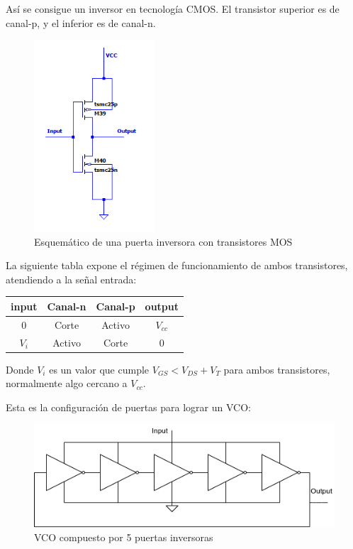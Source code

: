 \documentclass[12pt]{report} %
\begin{document}
	Así se consigue un inversor en tecnología CMOS. El transistor superior es de canal-p, y el inferior es de canal-n.
	\begin{figure}[H]
		\includegraphics[width=0.4\textwidth]{inverter-sch.png}
		\caption[Esquemático de una puerta inversora con transistores MOS]{Esquemático de una puerta inversora con transistores MOS}
		\label{fig:inverter-sch.png}
	\end{figure}
	
	La siguiente tabla expone el régimen de funcionamiento de ambos transistores, atendiendo a la señal entrada:
	
	\begin{table}[H]
		\begin{tabular}{|c|c|c|c|}
			\hline
			input & Canal-n & Canal-p & output\\
			\hline
			0 & Corte & Activo & $V_{cc}$ \\
			\hline
			$V_{i}$ & Activo & Corte & 0 \\
			\hline
		\end{tabular}
	\end{table}
	
	Donde $V_i$ es un valor que cumple $V_{GS} < V_{DS} + V_{T}$ para ambos transistores, normalmente algo cercano a $V_{cc}$.
	
	Esta es la configuración de puertas para lograr un VCO:
	
	\begin{figure}[H]
		\includegraphics[width=\textwidth]{vco-symbol.png}
		\caption[VCO compuesto por 5 puertas inversoras]{VCO compuesto por 5 puertas inversoras}
		\label{fig:vco-symbol.png}
	\end{figure}
	
\end{document}
